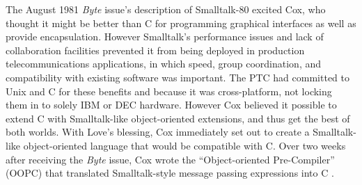 \documentclass[acmsmall,screen]{acmart}
\begin{document}
The August 1981 \emph{Byte} issue's description of Smalltalk-80 excited Cox, who thought it might be better than C for programming graphical interfaces as well as provide encapsulation. However Smalltalk's performance issues and lack of collaboration facilities prevented it from being deployed in production telecommunications applications, in which speed, group coordination, and compatibility with existing software was important. The PTC had committed to Unix and C for these benefits and because it was cross-platform, not locking them in to solely IBM or DEC hardware. However Cox believed it possible to extend C with Smalltalk-like object-oriented extensions, and thus get the best of both worlds. With Love's blessing, Cox immediately set out to create a Smalltalk-like object-oriented language that would be compatible with C. Over two weeks after receiving the \emph{Byte} issue, Cox wrote the ``Object-oriented Pre-Compiler'' (OOPC) that translated Smalltalk-style message passing expressions into C \citep{cox_object_1983}.
\end{document}
